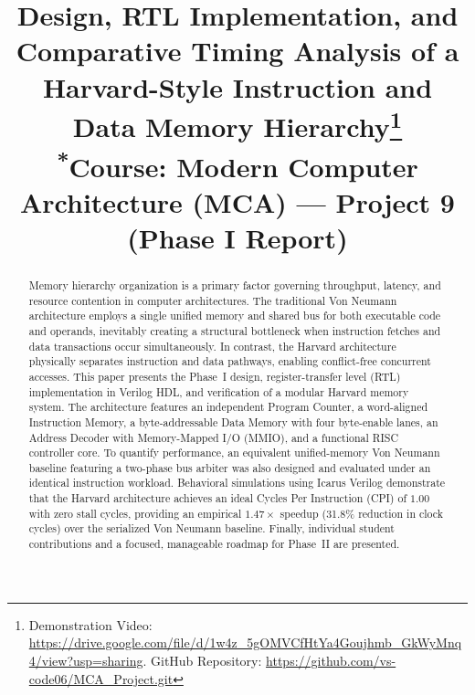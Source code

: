 \documentclass[conference]{IEEEtran}
\begin{document}
\title{Design, RTL Implementation, and Comparative Timing Analysis of a Harvard-Style Instruction and Data Memory Hierarchy\thanks{Demonstration Video: \url{https://drive.google.com/file/d/1w4z_5gOMVCfHtYa4Goujhmb_GkWyMnq4/view?usp=sharing}. GitHub Repository: \url{https://github.com/vs-code06/MCA_Project.git}}\\
{\footnotesize \textsuperscript{*}Course: Modern Computer Architecture (MCA) --- Project 9 (Phase I Report)}}

\author{
}

\maketitle

\begin{abstract}
Memory hierarchy organization is a primary factor governing throughput, latency, and resource contention in computer architectures. The traditional Von Neumann architecture employs a single unified memory and shared bus for both executable code and operands, inevitably creating a structural bottleneck when instruction fetches and data transactions occur simultaneously. In contrast, the Harvard architecture physically separates instruction and data pathways, enabling conflict-free concurrent accesses. This paper presents the Phase~I design, register-transfer level (RTL) implementation in Verilog HDL, and verification of a modular Harvard memory system. The architecture features an independent Program Counter, a word-aligned Instruction Memory, a byte-addressable Data Memory with four byte-enable lanes, an Address Decoder with Memory-Mapped I/O (MMIO), and a functional RISC controller core. To quantify performance, an equivalent unified-memory Von Neumann baseline featuring a two-phase bus arbiter was also designed and evaluated under an identical instruction workload. Behavioral simulations using Icarus Verilog demonstrate that the Harvard architecture achieves an ideal Cycles Per Instruction (CPI) of $1.00$ with zero stall cycles, providing an empirical $1.47\times$ speedup (31.8\% reduction in clock cycles) over the serialized Von Neumann baseline. Finally, individual student contributions and a focused, manageable roadmap for Phase~II are presented.
\end{abstract}
\end{document}
